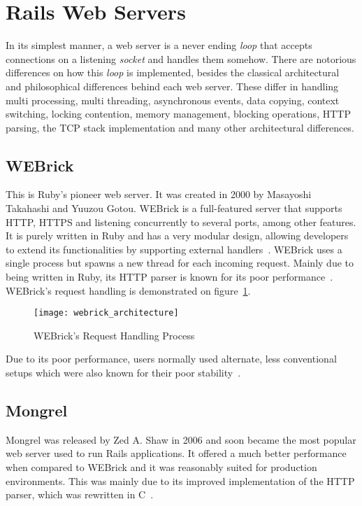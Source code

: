 \section{Rails Web Servers} %
\label{tech:sec:rails_webservers}
In its simplest manner, a web server is a never ending \textit{loop} that accepts connections on a listening \textit{socket} and handles them somehow. There are notorious differences on how this \textit{loop} is implemented, besides the classical architectural and philosophical differences behind each web server. These differ in handling multi processing, multi threading, asynchronous events, data copying, context switching, locking contention, memory management, blocking operations, HTTP parsing, the TCP stack implementation and many other architectural differences.


\subsection{WEBrick}
This is Ruby's pioneer web server. It was created in 2000 by Masayoshi Takahashi and Yuuzou Gotou. WEBrick is a full-featured server that supports HTTP, HTTPS and listening concurrently to several ports, among other features. It is purely written in Ruby and has a very modular design, allowing developers to extend its functionalities by supporting external handlers~\cite{webrick_guide}.
WEBrick uses a single process but spawns a new thread for each incoming request. Mainly due to being written in Ruby, its HTTP parser is known for its poor performance~\cite{ruby_webservers}. WEBrick's request handling is demonstrated on figure~\ref{fig:webrick_architecture}.
\begin{figure}[h!t]
  \centering
  \caption{WEBrick's Request Handling Process}
  \label{fig:webrick_architecture}
    \texttt{[image: webrick\_architecture]}
\end{figure}
Due to its poor performance, users normally used alternate, less conventional setups which were also known for their poor stability~\cite{ruby_webservers}.


\subsection{Mongrel}
Mongrel was released by Zed A. Shaw in 2006 and soon became the most popular web server used to run Rails applications. It offered a much better performance when compared to WEBrick and it was reasonably suited for production environments. This was mainly due to its improved implementation of the HTTP parser, which was rewritten in C~\cite{mongrel_server_production}.

